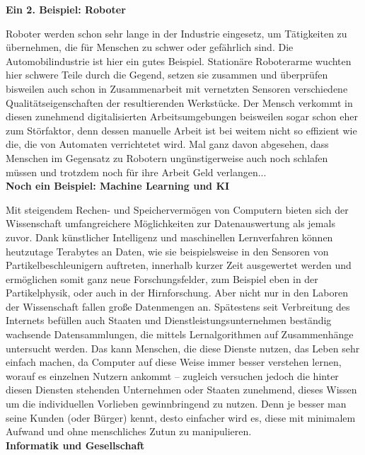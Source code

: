 {

\textbf{Ein 2. Beispiel: Roboter}

Roboter werden schon sehr lange in der Industrie eingesetz, um Tätigkeiten zu übernehmen, die für Menschen zu schwer oder gefährlich sind. Die Automobilindustrie ist hier ein gutes Beispiel. Stationäre Roboterarme wuchten hier schwere Teile durch die Gegend, setzen sie zusammen und überprüfen bisweilen auch schon in Zusammenarbeit mit vernetzten Sensoren verschiedene Qualitätseigenschaften der resultierenden Werkstücke. Der Mensch verkommt in diesen zunehmend digitalisierten Arbeitsumgebungen beisweilen sogar schon eher zum Störfaktor, denn dessen manuelle Arbeit ist bei weitem nicht so effizient wie die, die von Automaten verrichtetet wird. Mal ganz davon abgesehen, dass Menschen im Gegensatz zu Robotern ungünstigerweise auch noch schlafen müssen und trotzdem noch für ihre Arbeit Geld verlangen...\\

\textbf{Noch ein Beispiel: Machine Learning und KI}

Mit steigendem Rechen- und Speichervermögen von Computern bieten sich der Wissenschaft umfangreichere Möglichkeiten zur Datenauswertung als jemals zuvor. Dank künstlicher Intelligenz und maschinellen Lernverfahren können heutzutage Terabytes an Daten, wie sie beispielsweise in den Sensoren von Partikelbeschleunigern auftreten, innerhalb kurzer Zeit ausgewertet werden und ermöglichen somit ganz neue Forschungsfelder, zum Beispiel eben in der Partikelphysik, oder auch in der Hirnforschung. Aber nicht nur in den Laboren der Wissenschaft fallen große Datenmengen an. Spätestens seit Verbreitung des Internets befüllen auch Staaten und Dienstleistungsunternehmen beständig wachsende Datensammlungen, die mittels Lernalgorithmen auf Zusammenhänge untersucht werden. Das kann Menschen, die diese Dienste nutzen, das Leben sehr einfach machen, da Computer auf diese Weise immer besser verstehen lernen, worauf es einzelnen Nutzern ankommt -- zugleich versuchen jedoch die hinter diesen Diensten stehenden Unternehmen oder Staaten zunehmend, dieses Wissen um die individuellen Vorlieben gewinnbringend zu nutzen. Denn je besser man seine Kunden (oder Bürger) kennt, desto einfacher wird es, diese mit minimalem Aufwand und ohne menschliches Zutun zu manipulieren.\\

\textbf{Informatik und Gesellschaft}

}

